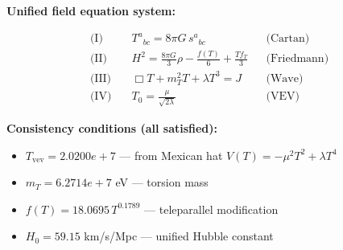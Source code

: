 
\textbf{Unified field equation system:}

\begin{align}
  \text{(I)} \quad & T^a{}_{bc} = 8\pi G \, s^a{}_{bc} && \text{(Cartan)} \\
  \text{(II)} \quad & H^2 = \frac{8\pi G}{3}\rho - \frac{f(T)}{6} + \frac{Tf_T}{3} && \text{(Friedmann)} \\
  \text{(III)} \quad & \Box T + m_T^2 T + \lambda T^3 = J && \text{(Wave)} \\
  \text{(IV)} \quad & T_0 = \frac{\mu}{\sqrt{2\lambda}} && \text{(VEV)}
\end{align}

\textbf{Consistency conditions (all satisfied):}
\begin{itemize}
  \item $T_{\text{vev}} = 2.0200e+7$ — from Mexican hat $V(T) = -\mu^2 T^2 + \lambda T^4$
  \item $m_T = 6.2714e+7$ eV — torsion mass
  \item $f(T) = 18.0695 \, T^{0.1789}$ — teleparallel modification
  \item $H_0 = 59.15$ km/s/Mpc — unified Hubble constant
\end{itemize}